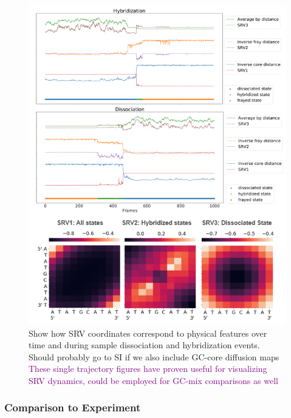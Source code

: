 \documentclass[journal=jpcbfk,manuscript=article]{achemso}
\begin{document}
\begin{figure}[ht!]
	\begin{center}
        \includegraphics[width=\textwidth]{Figs/figs_0804/GC-core_tracking_modes.png}
        \caption{Show how SRV coordinates correspond to physical features over time and during sample dissociation and hybridization events. Should probably go to SI if we also include GC-core diffusion maps \textcolor{purple}{These single trajectory figures have proven useful for visualizing SRV dynamics, could be employed for GC-mix comparisons as well}}
        \label{fig:GC-core_tracking_modes}
	\end{center}
\end{figure}    


\subsubsection{\label{sec:Results}Comparison to Experiment}
\end{document}
